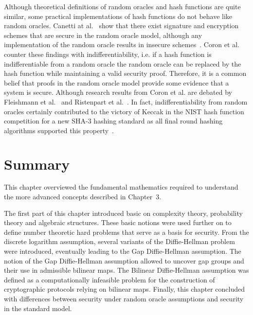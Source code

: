 Although theoretical definitions of random oracles and hash functions are quite similar, some practical implementations of hash functions do not behave like random oracles. Canetti at al.~\cite{art:CanettiGH04} show that there exist signature and encryption schemes that are secure in the random oracle model, although any implementation of the random oracle results in insecure schemes~\cite{art:CanettiGH04}. Coron et al.~\cite{art:CoronDMP05} counter these findings with indifferentiability, i.e. if a hash function is indifferentiable from a random oracle the random oracle can be replaced by the hash function while maintaining a valid security proof. Therefore, it is a common belief that proofs in the random oracle model provide some evidence that a system is secure. Although research results from Coron et al. are debated by Fleishmann et al.~\cite{art:FleischmannGL10} and Ristenpart et al.~\cite{art:RistenpartSS11}. In fact, indifferentiability from random oracles certainly contributed to the victory of Keccak in the NIST hash function competition for a new SHA-3 hashing standard as all final round hashing algorithms supported this property~\cite{art:BartheGHOB13}.

\section{Summary}
This chapter overviewed the fundamental mathematics required to understand the more advanced concepts described in Chapter~3.

The first part of this chapter introduced basic on complexity theory, probability theory and algebraic structures. These basic notions were used further on to define number theoretic hard problems that serve as a basis for security. From the discrete logarithm assumption, several variants of the Diffie-Hellman problem were introduced, eventually leading to the Gap Diffie-Hellman assumption. The notion of the Gap Diffie-Hellman assumption allowed to uncover gap groups and their use in admissible bilinear maps. The Bilinear Diffie-Hellman assumption was defined as a computationally infeasible problem for the construction of cryptographic protocols relying on bilinear maps. Finally, this chapter concluded with differences between security under random oracle assumptions and security in the standard model.

